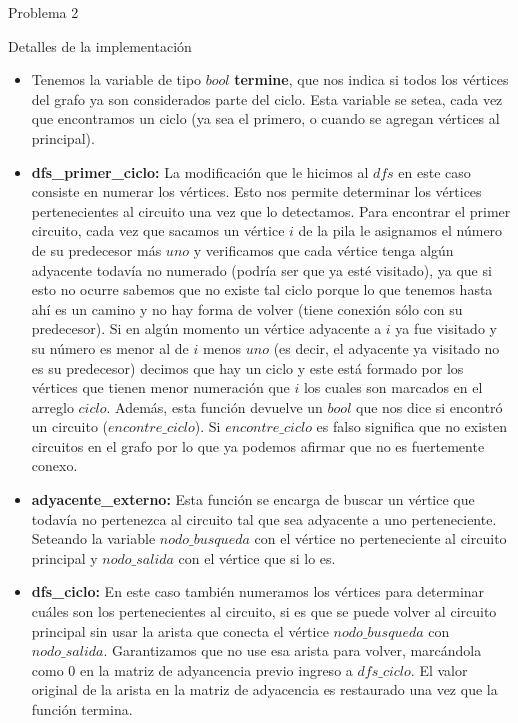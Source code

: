 \begin{section}{Problema 2}
\begin{subsection}{Detalles de la implementación}
		\begin{itemize}
			\item Tenemos la variable de tipo $bool$ \textbf{termine}, que nos indica si todos los vértices del grafo ya son considerados parte del ciclo. Esta variable se setea, cada vez que encontramos un ciclo (ya sea el primero, o cuando se agregan vértices al principal).

			\item \textbf{dfs\_primer\_ciclo:} La modificación que le hicimos al $dfs$ en este caso consiste en numerar los vértices. Esto nos permite determinar los vértices pertenecientes al circuito una vez que lo detectamos. Para encontrar el primer circuito, cada vez que sacamos un vértice $i$ de la pila le asignamos el número de su predecesor más $uno$ y verificamos que cada vértice tenga algún adyacente todavía no numerado (podría ser que ya esté visitado), ya que si esto no ocurre sabemos que no existe tal ciclo porque lo que tenemos hasta ahí es un camino y no hay forma de volver (tiene conexión sólo con su predecesor). Si en algún momento un vértice adyacente a $i$ ya fue visitado y su número es menor al de $i$ menos $uno$ (es decir, el adyacente ya visitado no es su predecesor) decimos que hay un ciclo y este está formado por los vértices que tienen menor numeración que $i$ los cuales son marcados en el arreglo $ciclo$. Además, esta función devuelve un $bool$ que nos dice si encontró un circuito ($encontre\_ciclo$). Si $encontre\_ciclo$ es falso significa que no existen circuitos en el grafo por lo que ya podemos afirmar que no es fuertemente conexo.

			\item \textbf{adyacente\_externo:} Esta función se encarga de buscar un vértice que todavía no pertenezca al circuito tal que sea adyacente a uno perteneciente. Seteando la variable $nodo\_busqueda$ con el vértice no perteneciente al circuito principal y $nodo\_salida$ con el vértice que si lo es.
		
			\item \textbf{dfs\_ciclo:} En este caso también numeramos los vértices para determinar cuáles son los pertenecientes al circuito, si es que se puede volver al circuito principal sin usar la arista que conecta el vértice $nodo\_busqueda$ con $nodo\_salida$. Garantizamos que no use esa arista para volver, marcándola como $0$ en la matriz de adyancencia previo ingreso a $dfs\_ciclo$. El valor original de la arista en la matriz de adyacencia es restaurado una vez que la función termina.
			

\end{itemize}
\end{subsection}
\end{section}
